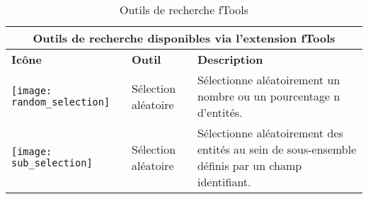 \begin{table}[ht]
\centering
\caption{Outils de recherche fTools}\label{tab:ftool_research}\medskip
 \begin{tabular}{|p{0.3in}|p{1.3in}|p{4.6in}|}
 \hline \multicolumn{3}{|c|}{\textbf{Outils de recherche disponibles via l'extension fTools}} \\ 
 \hline \textbf{Icône} & \textbf{Outil} & \textbf{Description} \\
 \hline \texttt{[image: random\_selection]} & Sélection aléatoire & Sélectionne aléatoirement un nombre ou un pourcentage n d'entités. \\
 \hline \texttt{[image: sub\_selection]} & Sélection aléatoire  & Sélectionne aléatoirement des entités au sein de sous-ensemble définis par un champ identifiant. \\

\end{tabular}
\end{table}
